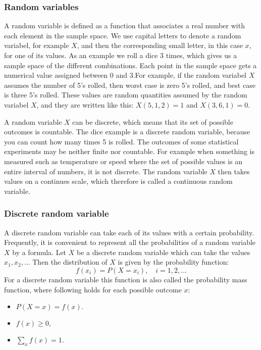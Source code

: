 
\subsubsection{Random variables}
A random variable is defined as a function that associates a real number with each element in the sample space. We use capital letters to denote a random variabel, for example $X$, and then the corresponding small letter, in this case $x$, for one of its values. As an example we roll a dice 3 times, which gives us a sample space of the different combinations. Each point in the sample space gets a numerical value assigned between 0 and 3.For example, if the random variabel $X$ assumes the number of 5's rolled, then worst case is zero 5's rolled, and best case is three 5's rolled. These values are random quantities assumed by the random variabel $X$, and they are written like this: $X(5,1,2) = 1$ and $X(3,6,1) = 0$.
\newline

\noindent A random variable $X$ can be discrete, which means that its set of possible outcomes is countable. The dice example is a discrete random variable, because you can count how many times 5 is rolled. The outcomes of some statistical experiments may be neither finite nor countable. For example when something is measured such as temperature or speed where the set of possible values is an entire interval of numbers, it is not discrete. The random variable $X$ then takes values on a continues scale, which therefore is called a continuous random variable.

\subsubsection{Discrete random variable}
A discrete random variable can take each of its values with a certain probability. Frequently, it is convenient to represent all the probabilities of a random variable $X$ by a formula. Let $X$ be a discrete random variable which can take the values $x_{1}, x_{2},...$ Then the distribution of $X$ is given by the probability function:
$$f(x_{i})=P(X=x_{i}),\quad i=1,2,...$$
\newline
For a discrete random variable this function is also called the probability mass function, where following holds for each possible outcome $x$:

\begin{itemize}
	\item $P(X = x) = f(x).$
	\item $f(x) \geq 0,$
	\item $\sum_x f(x) = 1.$
\end{itemize}

